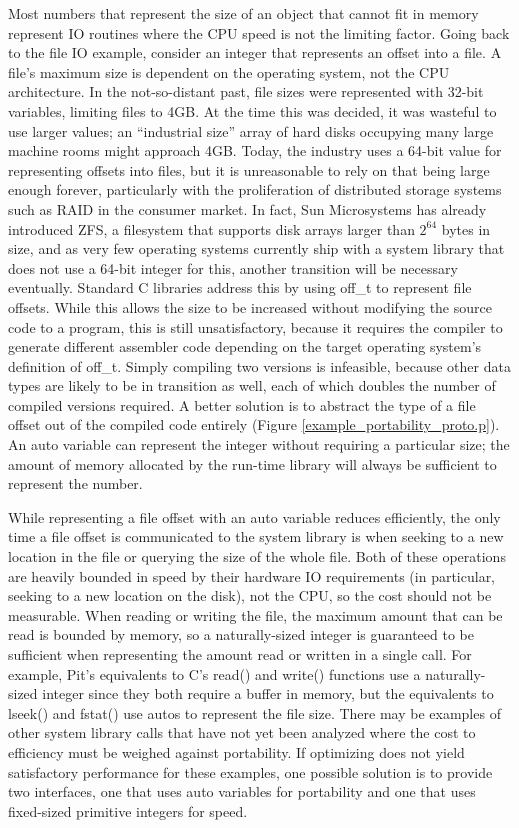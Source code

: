 Most numbers that represent the size of an object that cannot fit in memory represent IO routines where the CPU speed
is not the limiting factor.  Going back to the file IO example, consider an integer that represents an offset into a
file.  A file's maximum size is dependent on
the operating system, not the CPU architecture.  In the not-so-distant past, file sizes were represented with 32-bit variables, limiting files
to 4GB.  At the time this was decided, it was wasteful to use larger values; an ``industrial size'' array of hard
disks occupying many large machine rooms might approach 4GB.  Today, the industry uses a 64-bit value for
representing offsets into files, but it is unreasonable to rely on that being large enough forever, particularly with
the proliferation of distributed storage systems such as RAID in the consumer market.  In fact, Sun Microsystems has
already introduced ZFS, a filesystem that supports disk arrays larger than $2^{64}$ bytes in size, and as very few
operating systems currently ship with a system library that does not use a 64-bit integer for this, another transition
will be necessary eventually.  Standard C libraries address this by using off\_t to represent file
offsets.  While this allows the size to be increased without modifying the source code to a program, this is still
unsatisfactory, because it requires the compiler to generate different assembler code depending on the target operating
system's definition of off\_t.  Simply compiling two
versions is infeasible, because other data types are likely to be in transition as well, each of which doubles
the number of compiled versions required.  A better solution is to abstract the type of a file offset out of the
compiled code entirely (Figure \ref{example_portability_proto.p}).  An auto variable can represent the integer without requiring a
particular size; the amount of memory allocated by the run-time library will always be sufficient to represent the number.

While representing a file offset with an auto variable reduces efficiently, the only time a file offset is communicated to the
system library is when seeking to a new location in the file or querying the size of the whole file.  Both of these
operations are heavily bounded in speed by their hardware IO requirements (in particular, seeking to a new location on
the disk), not the CPU, so the cost should not be measurable.  When reading or writing the file, the maximum amount
that can be read is bounded by memory, so a naturally-sized integer is guaranteed to be sufficient when representing
the amount read or written in a single call.  For example, Pit's equivalents to C's read() and write() functions use
a naturally-sized integer since they both require a buffer in memory, but the equivalents to lseek() and fstat() use
autos to represent the file size.  There may be examples of other system library calls that have not yet
been analyzed where the cost to efficiency must be weighed against portability.  If optimizing does not yield
satisfactory performance for these examples, one possible solution is
to provide two interfaces, one that uses auto variables for portability and one that uses fixed-sized primitive integers for
speed.

